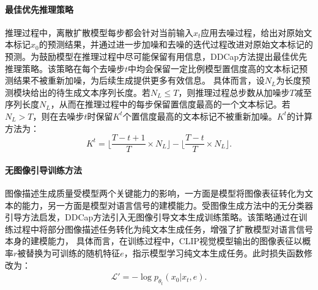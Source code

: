 \paragraph{最佳优先推理策略} 推理过程中，离散扩散模型每步都会针对当前输入$x_t$应用去噪过程，给出对原始文本标记$x_0$的预测结果，并通过进一步加噪和去噪的迭代过程改进对原始文本标记的预测。为鼓励模型在推理过程中尽可能保留有用信息，DDCap方法提出最佳优先推理策略。该策略在每个去噪步$t$中均会保留一定比例模型置信度高的文本标记预测结果不被重新加噪，为后续生成提供更多有效信息。
具体而言，设$N_{L}$为长度预测模块给出的待生成文本序列长度。若$N_{L}\le T$，则推理过程总步数从加噪步$T$减至序列长度$N_{L}$，从而在推理过程中的每步保留置信度最高的一个文本标记。若$N_{L}>T$，则在去噪步$t$时保留$K^{t}$个置信度最高的文本标记不被重新加噪。$K^{t}$的计算方法为：
\begin{equation}
    K^{t} = \lfloor \frac{T-t+1}{T}\times N_{L}\rfloor-\lfloor \frac{T-t}{T}\times N_{L}\rfloor.
\end{equation}

\paragraph{无图像引导训练方法} 图像描述生成质量受模型两个关键能力的影响，一方面是模型将图像表征转化为文本的能力，另一方面是模型对语言信号的建模能力。受图像生成方法中的无分类器引导方法\cite{glide, VQ-diffusion}启发，DDCap方法引入无图像引导文本生成训练策略。该策略通过在训练过程中将部分图像描述任务转化为纯文本生成任务，增强了扩散模型对语言信号本身的建模能力，
具体而言，在训练过程中，CLIP视觉模型输出的图像表征以概率$r$被替换为可训练的随机特征$e$，指示模型学习纯文本生成任务。此时损失函数修改为：
\begin{align}
    \mathcal{L}' = -\log p_{\theta_t}({x}_{0} | {x}_{t}, {e}).
\end{align}

